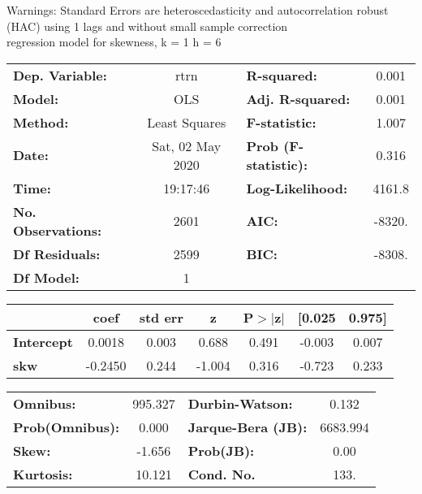 Warnings: \newline
 [1] Standard Errors are heteroscedasticity and autocorrelation robust (HAC) using 1 lags and without small sample correction\\ 

regression model for skewness, k = 1 h = 6\begin{center}
\begin{tabular}{lclc}
\toprule
\textbf{Dep. Variable:}    &       rtrn       & \textbf{  R-squared:         } &     0.001   \\
\textbf{Model:}            &       OLS        & \textbf{  Adj. R-squared:    } &     0.001   \\
\textbf{Method:}           &  Least Squares   & \textbf{  F-statistic:       } &     1.007   \\
\textbf{Date:}             & Sat, 02 May 2020 & \textbf{  Prob (F-statistic):} &    0.316    \\
\textbf{Time:}             &     19:17:46     & \textbf{  Log-Likelihood:    } &    4161.8   \\
\textbf{No. Observations:} &        2601      & \textbf{  AIC:               } &    -8320.   \\
\textbf{Df Residuals:}     &        2599      & \textbf{  BIC:               } &    -8308.   \\
\textbf{Df Model:}         &           1      & \textbf{                     } &             \\
\bottomrule
\end{tabular}
\begin{tabular}{lcccccc}
                   & \textbf{coef} & \textbf{std err} & \textbf{z} & \textbf{P$> |$z$|$} & \textbf{[0.025} & \textbf{0.975]}  \\
\midrule
\textbf{Intercept} &       0.0018  &        0.003     &     0.688  &         0.491        &       -0.003    &        0.007     \\
\textbf{skw}       &      -0.2450  &        0.244     &    -1.004  &         0.316        &       -0.723    &        0.233     \\
\bottomrule
\end{tabular}
\begin{tabular}{lclc}
\textbf{Omnibus:}       & 995.327 & \textbf{  Durbin-Watson:     } &    0.132  \\
\textbf{Prob(Omnibus):} &   0.000 & \textbf{  Jarque-Bera (JB):  } & 6683.994  \\
\textbf{Skew:}          &  -1.656 & \textbf{  Prob(JB):          } &     0.00  \\
\textbf{Kurtosis:}      &  10.121 & \textbf{  Cond. No.          } &     133.  \\
\bottomrule
\end{tabular}
\end{center}

